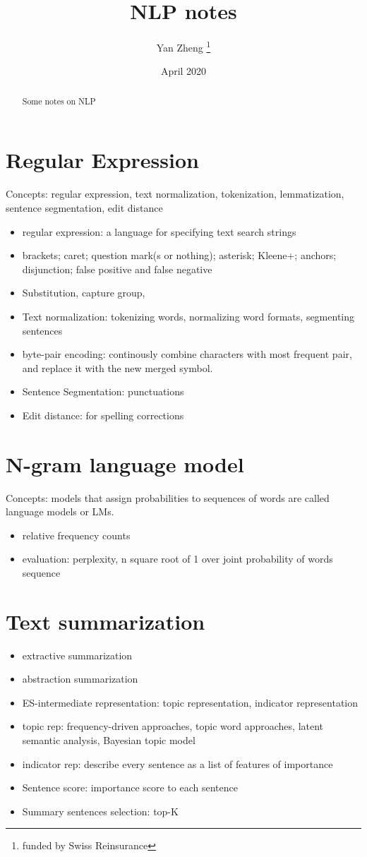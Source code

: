 \documentclass[12pt, letterpaper]{article}
\title{NLP notes}
\author{Yan Zheng \thanks{funded by Swiss Reinsurance}}
\date{April 2020}
\begin{document}
\maketitle

\begin{abstract}
Some notes on NLP
\end{abstract}

\section{Regular Expression}
Concepts: regular expression, text normalization, tokenization, lemmatization, sentence segmentation, edit distance
\begin{itemize}
	\item regular expression: a language for specifying text search strings
	\item brackets; caret; question mark(s or nothing); asterisk; Kleene+; anchors; disjunction; false positive and false negative
	\item Substitution, capture group, 
	\item Text normalization: tokenizing words, normalizing word formats, segmenting sentences
	\item byte-pair encoding: continously combine characters with most frequent pair, and replace it with the new merged symbol.
	\item Sentence Segmentation: punctuations
	\item Edit distance: for spelling corrections
\end{itemize}

\section{N-gram language model}
Concepts: models that assign probabilities to sequences of words are called language models or LMs.
\begin{itemize}
	\item relative frequency counts
	\item evaluation: perplexity, n square root of 1 over joint probability of words sequence
\end{itemize}

\section{Text summarization}
\begin{itemize}
	\item extractive summarization
	\item abstraction summarization
	\item ES-intermediate representation: topic representation, indicator representation
	\item topic rep: frequency-driven approaches, topic word approaches, latent semantic analysis, Bayesian topic model
	\item indicator rep: describe every sentence as a list of features of importance
	\item Sentence score: importance score to each sentence
	\item Summary sentences selection: top-K
\end{itemize}
\end{document}
